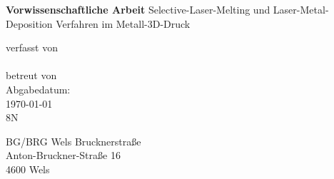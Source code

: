 \documentclass[main.tex]{subfiles}
\begin{document}
        \begin{titlepage}
	\thispagestyle{fancy}
    \renewcommand{\headrulewidth}{0pt}
    \renewcommand{\footrulewidth}{0pt}
    \vspace*{.6cm}
    \begin{center}
        \vspace*{1.1cm}
        \Huge
	\textbf{Vorwissenschaftliche Arbeit}
	\huge
	\vspace*{.1cm}
        Selective-Laser-Melting und Laser-Metal-Deposition Verfahren im Metall-3D-Druck
        \vspace*{1.5cm}

	\large
	verfasst von\\
	\LARGE
        \\
	\vspace*{1cm}
	\large
	betreut von\\
	\LARGE
        \vfill
	\Large
	Abgabedatum:\\
        \today \\
        \vspace{1cm}
	8N
    \end{center}
\end{titlepage}
\begin{center}
BG/BRG Wels Brucknerstraße\\
Anton-Bruckner-Straße 16\\
4600 Wels\\
\end{center}
\pagebreak
\end{document}
